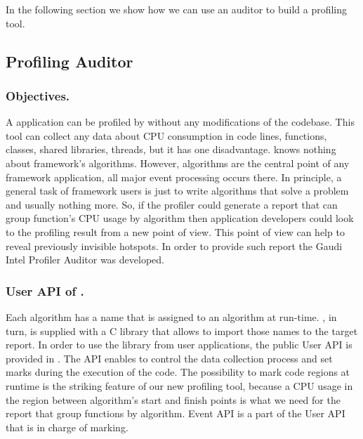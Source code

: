 In the following section we show how we can use an auditor to build a profiling
tool.

\subsection{Profiling Auditor}

\subsubsection{Objectives.}

A \gaudi application can be profiled by \amp  without any modifications of the
codebase.  This tool can collect any data about CPU consumption in code lines,
functions, classes, shared libraries, threads, but it has one disadvantage.
\amp knows nothing about \gaudi framework's algorithms. However, algorithms are
the central point of any framework application, all major event processing
occurs there. In principle, a general task of framework users is just to write
algorithms that solve a problem and usually nothing more. So, if the profiler
could generate a report that can group function’s CPU usage by algorithm then
application developers could look to the profiling result from a new point of
view. This point of view can help to reveal previously invisible hotspots. In
order to provide such report the Gaudi Intel Profiler Auditor was developed.

\subsubsection{User API of \iamp.}

Each \gaudi algorithm has a name that is assigned to an algorithm at run-time.
\amp, in turn, is supplied with a C library that allows to import those names
to the target report. In order to use the library from user applications, the
public User API is provided in \amp. The API enables to control the data
collection process and set marks during the execution of the code. The
possibility to mark code regions at runtime is the striking feature of our new
profiling tool, because a CPU usage in the region between algorithm’s start and
finish points is what we need for the report that group functions by algorithm.
Event API is a part of the User API  that is in charge of marking.

